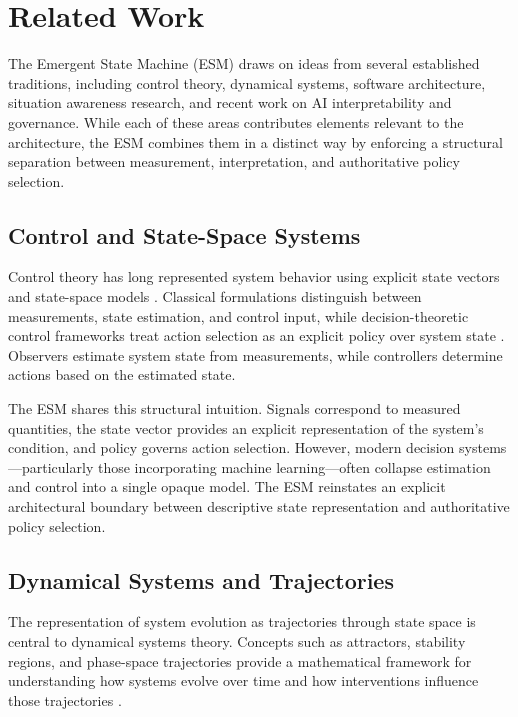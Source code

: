 \documentclass[11pt]{article}
\begin{document}

\section{Related Work}
\label{sec:related_work}

The Emergent State Machine (ESM) draws on ideas from several established traditions, including control theory, dynamical systems, software architecture, situation awareness research, and recent work on AI interpretability and governance. While each of these areas contributes elements relevant to the architecture, the ESM combines them in a distinct way by enforcing a structural separation between measurement, interpretation, and authoritative policy selection.

\subsection{Control and State-Space Systems}

Control theory has long represented system behavior using explicit state vectors and state-space models \citep{kalman1960,astrom2010}. Classical formulations distinguish between measurements, state estimation, and control input, while decision-theoretic control frameworks treat action selection as an explicit policy over system state \citep{bertsekas2017}. Observers estimate system state from measurements, while controllers determine actions based on the estimated state.

The ESM shares this structural intuition. Signals correspond to measured quantities, the state vector provides an explicit representation of the system’s condition, and policy governs action selection. However, modern decision systems—particularly those incorporating machine learning—often collapse estimation and control into a single opaque model. The ESM reinstates an explicit architectural boundary between descriptive state representation and authoritative policy selection.

\subsection{Dynamical Systems and Trajectories}

The representation of system evolution as trajectories through state space is central to dynamical systems theory. Concepts such as attractors, stability regions, and phase-space trajectories provide a mathematical framework for understanding how systems evolve over time and how interventions influence those trajectories \citep{strogatz2015}.
\end{document}
